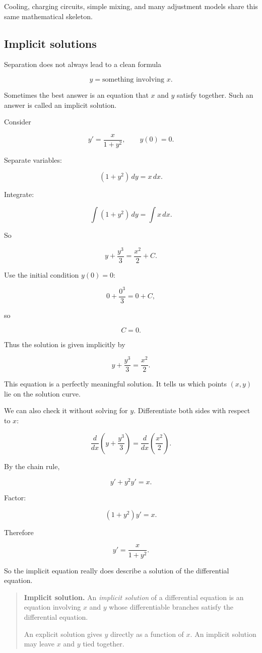 Cooling, charging circuits, simple mixing, and many adjustment models share this same
mathematical skeleton.

\subsection{Implicit solutions}
\label{subsec:implicit-solutions-separable}

Separation does not always lead to a clean formula

\[
y=\text{something involving }x.
\]

Sometimes the best answer is an equation that \(x\) and \(y\) satisfy together.  Such an
answer is called an implicit solution.

Consider

\[
y'=\frac{x}{1+y^2},
\qquad
y(0)=0.
\]

Separate variables:

\[
(1+y^2)\,dy=x\,dx.
\]

Integrate:

\[
\int(1+y^2)\,dy=\int x\,dx.
\]

So

\[
y+\frac{y^3}{3}=\frac{x^2}{2}+C.
\]

Use the initial condition \(y(0)=0\):

\[
0+\frac{0^3}{3}=0+C,
\]

so

\[
C=0.
\]

Thus the solution is given implicitly by

\[
\boxed{
y+\frac{y^3}{3}=\frac{x^2}{2}.
}
\]

This equation is a perfectly meaningful solution.  It tells us which points \((x,y)\)
lie on the solution curve.

We can also check it without solving for \(y\).  Differentiate both sides with respect to
\(x\):

\[
\frac{d}{dx}\left(y+\frac{y^3}{3}\right)
=
\frac{d}{dx}\left(\frac{x^2}{2}\right).
\]

By the chain rule,

\[
y'+y^2y'=x.
\]

Factor:

\[
(1+y^2)y'=x.
\]

Therefore

\[
y'=\frac{x}{1+y^2}.
\]

So the implicit equation really does describe a solution of the differential equation.

\begin{quote}
\textbf{Implicit solution.}
An \emph{implicit solution} of a differential equation is an equation involving \(x\)
and \(y\) whose differentiable branches satisfy the differential equation.

An explicit solution gives \(y\) directly as a function of \(x\).  An implicit solution may
leave \(x\) and \(y\) tied together.
\end{quote}

